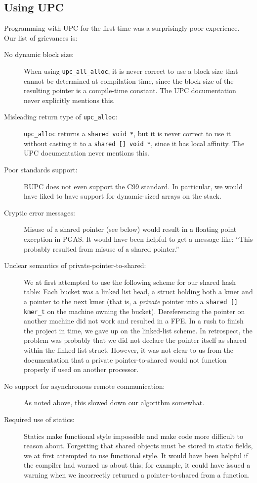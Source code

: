 \documentclass{article}
\begin{document}
\subsection{Using UPC}
Programming with UPC for the first time was a surprisingly poor experience.  Our list of grievances is:
\begin{description}
  \item[No dynamic block size:] When using \texttt{upc\_all\_alloc}, it is never correct to use a block size that cannot be determined at compilation time, since the block size of the resulting pointer is a compile-time constant.  The UPC documentation never explicitly mentions this.
  \item[Misleading return type of \texttt{upc\_alloc}:] \texttt{upc\_alloc} returns a \texttt{shared void *}, but it is never correct to use it without casting it to a \texttt{shared [] void *}, since it has local affinity.  The UPC documentation never mentions this.
  \item[Poor standards support:] BUPC does not even support the C99 standard.  In particular, we would have liked to have support for dynamic-sized arrays on the stack.
  \item[Cryptic error messages:] Misuse of a shared pointer (see below) would result in a floating point exception in PGAS.  It would have been helpful to get a message like: ``This probably resulted from misuse of a shared pointer.''
  \item[Unclear semantics of private-pointer-to-shared:] We at first attempted to use the following scheme for our shared hash table: Each bucket was a linked list head, a struct holding both a kmer and a pointer to the next kmer (that is, a \emph{private} pointer into a \texttt{shared [] kmer\_t} on the machine owning the bucket).  Dereferencing the pointer on another machine did not work and resulted in a FPE.  In a rush to finish the project in time, we gave up on the linked-list scheme.  In retrospect, the problem was probably that we did not declare the pointer itself as shared within the linked list struct.  However, it was not clear to us from the documentation that a private pointer-to-shared would not function properly if used on another processor.
  \item[No support for asynchronous remote communication:] As noted above, this slowed down our algorithm somewhat.
  \item[Required use of statics:] Statics make functional style impossible and make code more difficult to reason about.  Forgetting that shared objects must be stored in static fields, we at first attempted to use functional style.  It would have been helpful if the compiler had warned us about this; for example, it could have issued a warning when we incorrectly returned a pointer-to-shared from a function.
\end{description}
\end{document}
